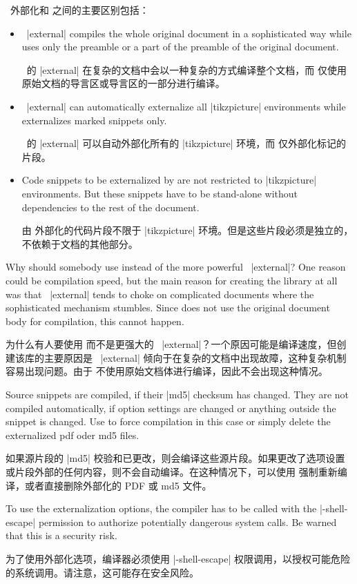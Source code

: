 \tikzname\ 外部化和  之间的主要区别包括：
\begin{itemize}
\item\tikzname\ |external| compiles the whole original document in a sophisticated
  way while  uses only the preamble or a part of the preamble
  of the original document.

\tikzname\ 的 |external| 在复杂的文档中会以一种复杂的方式编译整个文档，而  仅使用原始文档的导言区或导言区的一部分进行编译。
\item\tikzname\ |external| can automatically externalize all |tikzpicture|
  environments while  externalizes marked snippets only.

\tikzname\ 的 |external| 可以自动外部化所有的 |tikzpicture| 环境，而  仅外部化标记的片段。
  \item Code snippets to be externalized by  are not restricted to
  |tikzpicture| environments. But these snippets have to be stand-alone without
  dependencies to the rest of the document.

由  外部化的代码片段不限于 |tikzpicture| 环境。但是这些片段必须是独立的，不依赖于文档的其他部分。
\end{itemize}
Why should somebody use  instead of the more powerful \tikzname\ |external|?
One reason could be compilation speed, but the main reason for creating the
library at all was that \tikzname\ |external| tends to choke on complicated
documents where the sophisticated mechanism stumbles. Since  does
not use the original document body for compilation, this cannot happen.

为什么有人要使用  而不是更强大的 \tikzname\ |external|？一个原因可能是编译速度，但创建该库的主要原因是 \tikzname\ |external| 倾向于在复杂的文档中出现故障，这种复杂机制容易出现问题。由于  不使用原始文档体进行编译，因此不会出现这种情况。
\begin{marker}
Source snippets are compiled, if their |md5| checksum has changed.
They are not compiled automatically, if option settings are changed or
anything outside the snippet is changed.
Use  to force compilation in this case
or simply delete the externalized pdf oder md5 files.

如果源片段的 |md5| 校验和已更改，则会编译这些源片段。如果更改了选项设置或片段外部的任何内容，则不会自动编译。在这种情况下，可以使用  强制重新编译，或者直接删除外部化的 PDF 或 md5 文件。
\end{marker}

\begin{marker}
To use the externalization options, the compiler has to be called with the
|-shell-escape| permission to authorize potentially dangerous system calls.
Be warned that this is a security risk.

为了使用外部化选项，编译器必须使用 |-shell-escape| 权限调用，以授权可能危险的系统调用。请注意，这可能存在安全风险。
\end{marker}